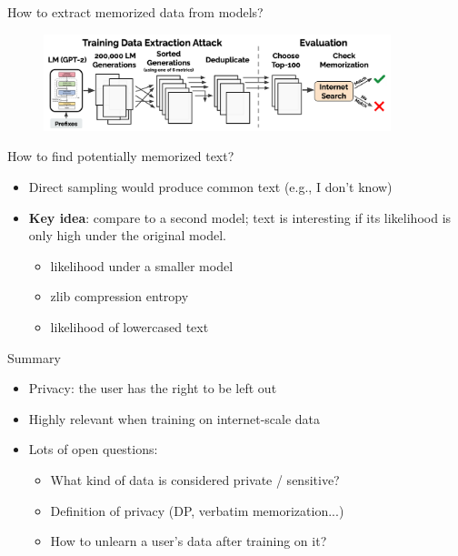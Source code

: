 \documentclass[usenames,dvipsnames,notes,11pt,aspectratio=169,hyperref={colorlinks=true, linkcolor=blue}]{beamer}
\begin{document}
\begin{frame}
    {How to extract memorized data from models?}
            \begin{figure}
            \includegraphics[width=0.9\textwidth]{figures/mem-gpt2-method}
            \end{figure}
            \vspace{-2em}

            \pause
            How to find potentially memorized text?\\
            \begin{itemize}
                \item Direct sampling would produce common text (e.g., I don't know)
                \item \textbf{Key idea}: compare to a second model; text is interesting if its likelihood is only high under the original model.
                    \begin{itemize}
                        \item likelihood under a smaller model 
                        \item zlib compression entropy
                        \item likelihood of lowercased text 
                    \end{itemize}
            \end{itemize}
\end{frame}

\begin{frame}
    {Summary}
    \begin{itemize}
        \item Privacy: the user has the right to be left out
        \item Highly relevant when training on internet-scale data
        \item Lots of open questions:
            \begin{itemize}
                \item What kind of data is considered private / sensitive?
                \item Definition of privacy (DP, verbatim memorization...)
                \item How to unlearn a user's data after training on it? 
            \end{itemize}
    \end{itemize}
\end{frame}
\end{document}
